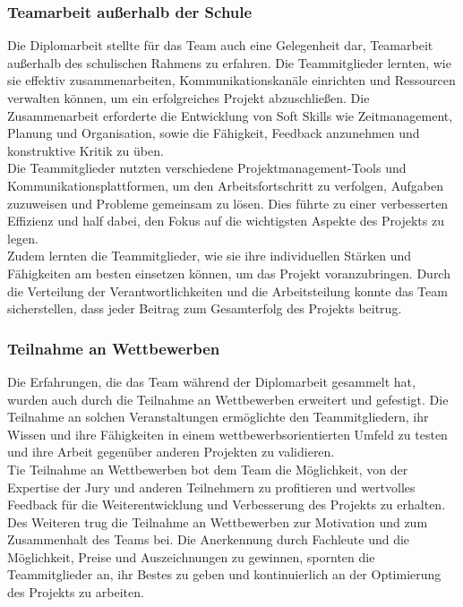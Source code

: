 \subsubsection{Teamarbeit außerhalb der Schule}

Die Diplomarbeit stellte für das Team auch eine Gelegenheit dar, Teamarbeit außerhalb des schulischen Rahmens zu erfahren. Die Teammitglieder lernten, wie sie effektiv zusammenarbeiten, Kommunikationskanäle einrichten und Ressourcen verwalten können, um ein erfolgreiches Projekt abzuschließen. Die Zusammenarbeit erforderte die Entwicklung von Soft Skills wie Zeitmanagement, Planung und Organisation, sowie die Fähigkeit, Feedback anzunehmen und konstruktive Kritik zu üben.
\\
Die Teammitglieder nutzten verschiedene Projektmanagement-Tools und Kommunikationsplattformen, um den Arbeitsfortschritt zu verfolgen, Aufgaben zuzuweisen und Probleme gemeinsam zu lösen. Dies führte zu einer verbesserten Effizienz und half dabei, den Fokus auf die wichtigsten Aspekte des Projekts zu legen.
\\
Zudem lernten die Teammitglieder, wie sie ihre individuellen Stärken und Fähigkeiten am besten einsetzen können, um das Projekt voranzubringen. Durch die Verteilung der Verantwortlichkeiten und die Arbeitsteilung konnte das Team sicherstellen, dass jeder Beitrag zum Gesamterfolg des Projekts beitrug.

\subsubsection{Teilnahme an Wettbewerben}

Die Erfahrungen, die das Team während der Diplomarbeit gesammelt hat, wurden auch durch die Teilnahme an Wettbewerben erweitert und gefestigt. Die Teilnahme an solchen Veranstaltungen ermöglichte den Teammitgliedern, ihr Wissen und ihre Fähigkeiten in einem wettbewerbsorientierten Umfeld zu testen und ihre Arbeit gegenüber anderen Projekten zu validieren.
\\
Tie Teilnahme an Wettbewerben bot dem Team die Möglichkeit, von der Expertise der Jury und anderen Teilnehmern zu profitieren und wertvolles Feedback für die Weiterentwicklung und Verbesserung des Projekts zu erhalten.
\\
Des Weiteren trug die Teilnahme an Wettbewerben zur Motivation und zum Zusammenhalt des Teams bei. Die Anerkennung durch Fachleute und die Möglichkeit, Preise und Auszeichnungen zu gewinnen, spornten die Teammitglieder an, ihr Bestes zu geben und kontinuierlich an der Optimierung des Projekts zu arbeiten.
